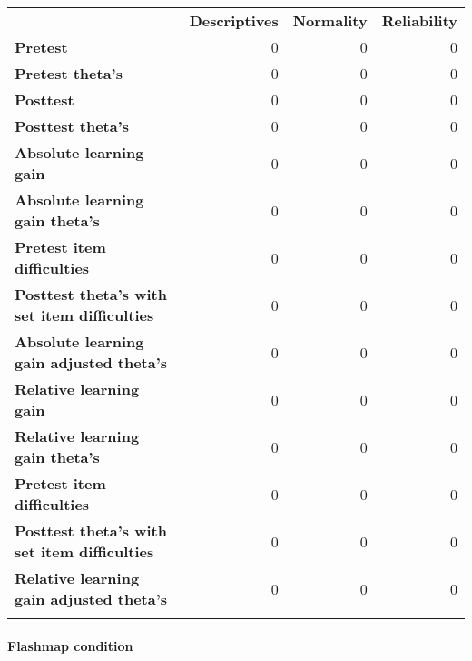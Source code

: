 \begin{longtable}[c]{@{}lrrr@{}}
\toprule\addlinespace
& \textbf{Descriptives} & \textbf{Normality} & \textbf{Reliability}
\\\addlinespace
\midrule\endhead
\textbf{Pretest} & 0 & 0 & 0
\\\addlinespace
\textbf{Pretest theta's} & 0 & 0 & 0
\\\addlinespace
\textbf{Posttest} & 0 & 0 & 0
\\\addlinespace
\textbf{Posttest theta's} & 0 & 0 & 0
\\\addlinespace
\textbf{Absolute learning gain} & 0 & 0 & 0
\\\addlinespace
\textbf{Absolute learning gain theta's} & 0 & 0 & 0
\\\addlinespace
\textbf{Pretest item difficulties} & 0 & 0 & 0
\\\addlinespace
\textbf{Posttest theta's with set item difficulties} & 0 & 0 & 0
\\\addlinespace
\textbf{Absolute learning gain adjusted theta's} & 0 & 0 & 0
\\\addlinespace
\textbf{Relative learning gain} & 0 & 0 & 0
\\\addlinespace
\textbf{Relative learning gain theta's} & 0 & 0 & 0
\\\addlinespace
\textbf{Pretest item difficulties} & 0 & 0 & 0
\\\addlinespace
\textbf{Posttest theta's with set item difficulties} & 0 & 0 & 0
\\\addlinespace
\textbf{Relative learning gain adjusted theta's} & 0 & 0 & 0
\\\addlinespace
\bottomrule
\end{longtable}

\paragraph{Flashmap condition}\label{flashmap-condition-1}

